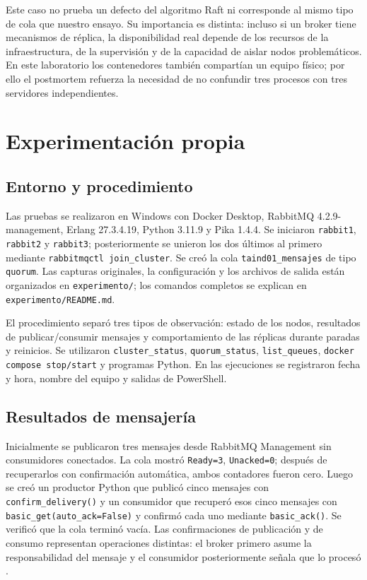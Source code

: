 \documentclass[12pt,a4paper]{article}
\begin{document}
Este caso no prueba un defecto del algoritmo Raft ni corresponde al mismo tipo de cola que nuestro ensayo. Su importancia es distinta: incluso si un broker tiene mecanismos de réplica, la disponibilidad real depende de los recursos de la infraestructura, de la supervisión y de la capacidad de aislar nodos problemáticos. En este laboratorio los contenedores también compartían un equipo físico; por ello el postmortem refuerza la necesidad de no confundir tres procesos con tres servidores independientes.

\section{Experimentación propia}
\subsection{Entorno y procedimiento}
Las pruebas se realizaron en Windows con Docker Desktop, RabbitMQ 4.2.9-management, Erlang 27.3.4.19, Python 3.11.9 y Pika 1.4.4. Se iniciaron \texttt{rabbit1}, \texttt{rabbit2} y \texttt{rabbit3}; posteriormente se unieron los dos últimos al primero mediante \texttt{rabbitmqctl join\_cluster}. Se creó la cola \texttt{taind01\_mensajes} de tipo \texttt{quorum}. Las capturas originales, la configuración y los archivos de salida están organizados en \texttt{experimento/}; los comandos completos se explican en \texttt{experimento/README.md}.

El procedimiento separó tres tipos de observación: estado de los nodos, resultados de publicar/consumir mensajes y comportamiento de las réplicas durante paradas y reinicios. Se utilizaron \texttt{cluster\_status}, \texttt{quorum\_status}, \texttt{list\_queues}, \texttt{docker compose stop/start} y programas Python. En las ejecuciones se registraron fecha y hora, nombre del equipo y salidas de PowerShell.

\subsection{Resultados de mensajería}
Inicialmente se publicaron tres mensajes desde RabbitMQ Management sin consumidores conectados. La cola mostró \texttt{Ready=3}, \texttt{Unacked=0}; después de recuperarlos con confirmación automática, ambos contadores fueron cero. Luego se creó un productor Python que publicó cinco mensajes con \texttt{confirm\_delivery()} y un consumidor que recuperó esos cinco mensajes con \texttt{basic\_get(auto\_ack=False)} y confirmó cada uno mediante \texttt{basic\_ack()}. Se verificó que la cola terminó vacía. Las confirmaciones de publicación y de consumo representan operaciones distintas: el broker primero asume la responsabilidad del mensaje y el consumidor posteriormente señala que lo procesó \cite{RabbitMQReliability2026}.
\end{document}
